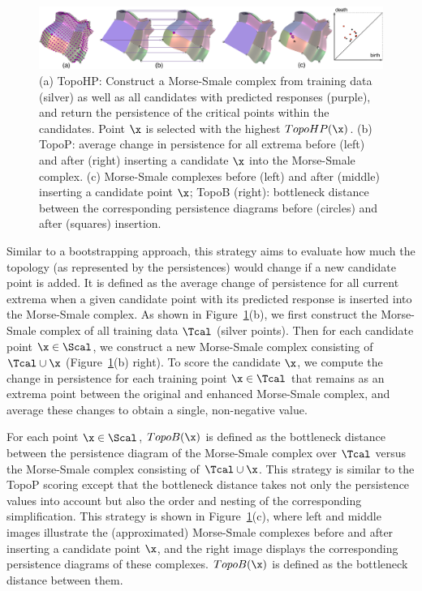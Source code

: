 \begin{figure}[!t]
\begin{center}
\includegraphics[width=1.0\linewidth]{figs/chap5/topo-all}
\caption[Illustration of topological scoring methods]{(a) TopoHP: Construct a Morse-Smale complex from training data (silver) as well as all candidates with predicted responses (purple), and return the persistence of the critical points within the candidates.
%
Point $\protect\x$ is selected with the highest $TopoHP(\protect\x)$.
%
(b) TopoP: average change in persistence for all extrema before (left) and after (right) inserting a candidate $\protect\x$ into the Morse-Smale complex.
%
(c) Morse-Smale complexes before (left) and after (middle) inserting a candidate point $\protect\x$;
%
TopoB (right): bottleneck distance between the corresponding persistence diagrams before (circles) and after (squares) insertion.}
\label{fig:topo-all}
\end{center}
\end{figure}

 Similar to a bootstrapping approach, this strategy aims to evaluate how much the topology (as represented by the persistences) would change if a new candidate point is added.
%
It is defined as the average change of persistence for all current extrema when a given candidate point with its predicted response is inserted into the Morse-Smale complex.
%
As shown in Figure~\ref{fig:topo-all}(b), we first construct the Morse-Smale complex of all training data $\Tcal$ (silver points).
%
Then for each candidate point $\x \in \Scal$, we construct a new Morse-Smale complex consisting of $\Tcal \cup \x$ (Figure~\ref{fig:topo-all}(b) right).
%
To score the candidate $\x$, we compute the change in persistence for each training point $\x \in \Tcal$ that remains as an extrema point between the original and enhanced Morse-Smale complex, and average these changes to obtain a single, non-negative value.

 For each point $\x \in \Scal$, $TopoB(\x)$ is defined as the bottleneck distance between the persistence diagram of the Morse-Smale complex over $\Tcal$ versus the Morse-Smale complex consisting of $\Tcal \cup \x$.
%
This strategy is similar to the TopoP scoring except that the bottleneck distance takes not only the persistence values into account but also the order and nesting of the corresponding simplification.
%
This strategy is shown in Figure~\ref{fig:topo-all}(c), where left and middle images illustrate the (approximated) Morse-Smale complexes before and after inserting a candidate point $\x$, and the right image displays the corresponding persistence diagrams of these complexes.
%
$TopoB(\x)$ is defined as the bottleneck distance between them.

